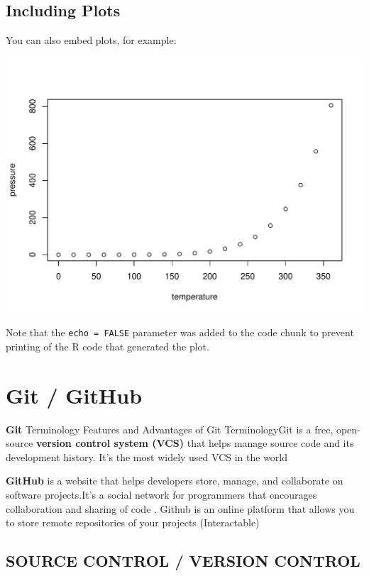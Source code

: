 \documentclass[
]{article}
\begin{document}
\subsection{Including Plots}\label{including-plots}

You can also embed plots, for example:

\includegraphics{Guideline-Book_files/figure-latex/pressure-1.pdf}

Note that the \texttt{echo\ =\ FALSE} parameter was added to the code
chunk to prevent printing of the R code that generated the plot.

\newpage

\section{Git / GitHub}\label{git-github}

\textbf{Git} Terminology Features and Advantages of Git TerminologyGit
is a free, open-source \textbf{version control system (VCS)} that helps
manage source code and its development history. It's the most widely
used VCS in the world

\textbf{GitHub} is a website that helps developers store, manage, and
collaborate on software projects.It's a social network for programmers
that encourages collaboration and sharing of code . Github is an online
platform that allows you to store remote repositories of your projects
(Interactable)

\subsection{SOURCE CONTROL / VERSION
CONTROL}\label{source-control-version-control}
\end{document}
